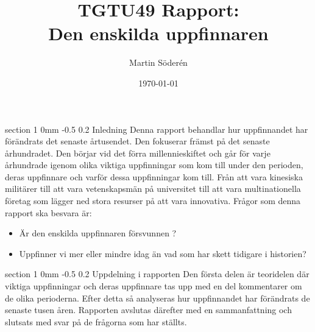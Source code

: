 \documentclass[a4paper,12pt]{article}
\makeatletter
\renewcommand{\section}{\@startsection
   {section}%
   {1}%
   {0mm}%
   {-0.5\baselineskip}%
   {0.2\baselineskip}%
   {\sffamily\bfseries\upshape\normalsize}}%
\makeatother
\begin{document}
\begin{titlepage}
\title{TGTU49 Rapport:\\
Den enskilda uppfinnaren}
\author{Martin Söderén}
\date{\today}
\maketitle



\vfill %

\thispagestyle{empty}

\end{titlepage}
\renewcommand*\contentsname{Innehållsförteckning}
\renewcommand\refname{Referenser}
\tableofcontents
\newpage

\section{Inledning}
Denna rapport behandlar hur uppfinnandet har förändrats det senaste årtusendet. Den fokuserar främst på det senaste århundradet. Den börjar vid det förra millennieskiftet och går för varje århundrade igenom olika viktiga uppfinningar som kom till under den perioden, deras uppfinnare och varför dessa uppfinningar kom till. Från att vara kinesiska militärer till att vara vetenskapsmän på universitet till att vara multinationella företag som lägger ned stora resurser på att vara innovativa. Frågor som denna rapport ska besvara är:
\begin{itemize}
\item Är den enskilda uppfinnaren försvunnen ?
\item Uppfinner vi mer eller mindre idag än vad som har skett tidigare i historien?
\end{itemize} 


\section{Uppdelning i rapporten}
Den första delen är teoridelen där viktiga uppfinningar och deras uppfinnare tas upp med en del kommentarer om de olika perioderna. Efter detta så analyseras hur uppfinnandet har förändrats de senaste tusen åren. Rapporten avslutas därefter med en sammanfattning och slutsats med svar på de frågorna som har ställts. 
\end{document}
